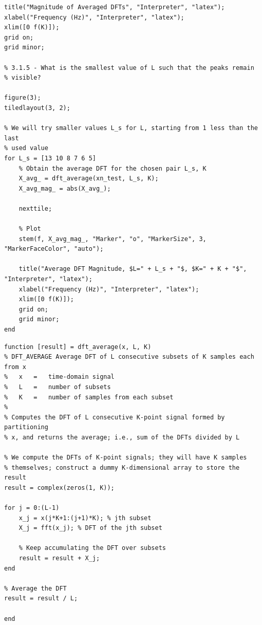 \documentclass{article}[a4paper]
\begin{document}
\begin{lstlisting}[caption={Main Code}, label=harmonic_main]
title("Magnitude of Averaged DFTs", "Interpreter", "latex");
xlabel("Frequency (Hz)", "Interpreter", "latex");
xlim([0 f(K)]);
grid on;
grid minor;

% 3.1.5 - What is the smallest value of L such that the peaks remain
% visible?

figure(3);
tiledlayout(3, 2);

% We will try smaller values L_s for L, starting from 1 less than the last
% used value
for L_s = [13 10 8 7 6 5]
	% Obtain the average DFT for the chosen pair L_s, K
	X_avg_ = dft_average(xn_test, L_s, K);
	X_avg_mag_ = abs(X_avg_);
	
	nexttile;
	
	% Plot
	stem(f, X_avg_mag_, "Marker", "o", "MarkerSize", 3, "MarkerFaceColor", "auto");
	
	title("Average DFT Magnitude, $L=" + L_s + "$, $K=" + K + "$", "Interpreter", "latex");
	xlabel("Frequency (Hz)", "Interpreter", "latex");
	xlim([0 f(K)]);
	grid on;
	grid minor;
end
	\end{lstlisting}
	
	\begin{lstlisting}[caption={DFT averaging}, label=dft_avg_code]
function [result] = dft_average(x, L, K)
% DFT_AVERAGE Average DFT of L consecutive subsets of K samples each from x
%   x   =   time-domain signal
%   L   =   number of subsets
%   K   =   number of samples from each subset
%
% Computes the DFT of L consecutive K-point signal formed by partitioning
% x, and returns the average; i.e., sum of the DFTs divided by L

% We compute the DFTs of K-point signals; they will have K samples
% themselves; construct a dummy K-dimensional array to store the result
result = complex(zeros(1, K));

for j = 0:(L-1)
	x_j = x(j*K+1:(j+1)*K); % jth subset
	X_j = fft(x_j); % DFT of the jth subset
	
	% Keep accumulating the DFT over subsets
	result = result + X_j;
end

% Average the DFT
result = result / L;

end
	\end{lstlisting}
	
\end{document}
